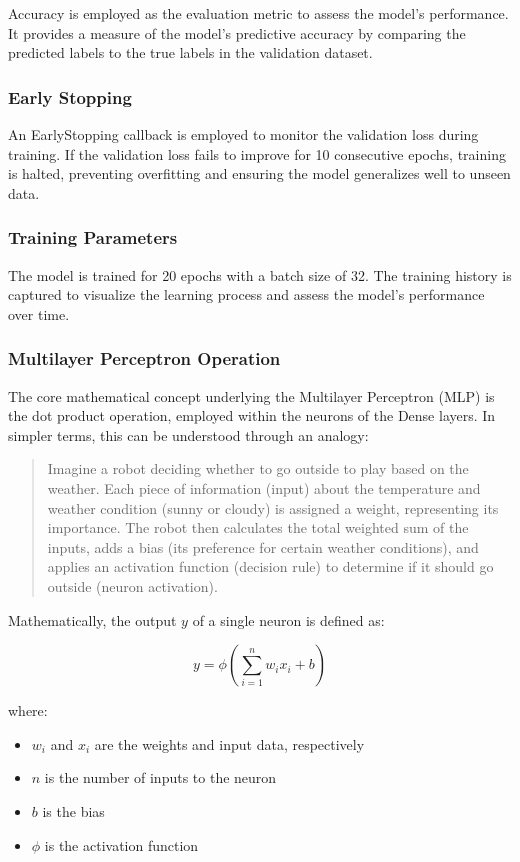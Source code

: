 Accuracy is employed as the evaluation metric to assess the model's performance. It provides a measure of the model's predictive accuracy by comparing the predicted labels to the true labels in the validation dataset.

\subsubsection{Early Stopping}

An EarlyStopping callback is employed to monitor the validation loss during training. If the validation loss fails to improve for 10 consecutive epochs, training is halted, preventing overfitting and ensuring the model generalizes well to unseen data.

\subsubsection{Training Parameters}

The model is trained for 20 epochs with a batch size of 32. The training history is captured to visualize the learning process and assess the model's performance over time.

\subsubsection{Multilayer Perceptron Operation}

The core mathematical concept underlying the Multilayer Perceptron (MLP) is the dot product operation, employed within the neurons of the Dense layers. In simpler terms, this can be understood through an analogy:

\begin{quote}
Imagine a robot deciding whether to go outside to play based on the weather. Each piece of information (input) about the temperature and weather condition (sunny or cloudy) is assigned a weight, representing its importance. The robot then calculates the total weighted sum of the inputs, adds a bias (its preference for certain weather conditions), and applies an activation function (decision rule) to determine if it should go outside (neuron activation).
\end{quote}

Mathematically, the output \(y\) of a single neuron is defined as:

\[
y = \phi \left( \sum_{i=1}^{n} w_i x_i + b \right)
\]

where:
\begin{itemize}
  \item \(w_i\) and \(x_i\) are the weights and input data, respectively
  \item \(n\) is the number of inputs to the neuron
  \item \(b\) is the bias
  \item \(\phi\) is the activation function
\end{itemize}

